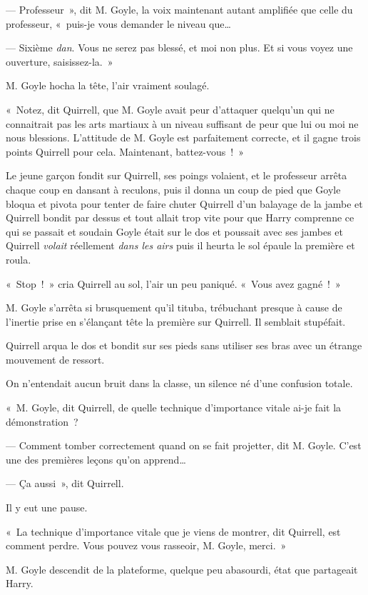 --- Professeur~», dit M. Goyle, la voix maintenant autant amplifiée que celle du professeur, «~puis-je vous demander le niveau que…

--- Sixième \emph{dan}.
Vous ne serez pas blessé, et moi non plus.
Et si vous voyez une ouverture, saisissez-la.~»

M. Goyle hocha la tête, l'air vraiment soulagé.

«~Notez, dit Quirrell, que M. Goyle avait peur d'attaquer quelqu'un qui ne connaitrait pas les arts martiaux à un niveau suffisant de peur que lui ou moi ne nous blessions.
L'attitude de M. Goyle est parfaitement correcte, et il gagne trois points Quirrell pour cela.
Maintenant, battez-vous~!~»

Le jeune garçon fondit sur Quirrell, ses poings volaient, et le professeur arrêta chaque coup en dansant à reculons, puis il donna un coup de pied que Goyle bloqua et pivota pour tenter de faire chuter Quirrell d'un balayage de la jambe et Quirrell bondit par dessus et tout allait trop vite pour que Harry comprenne ce qui se passait et soudain Goyle était sur le dos et poussait avec ses jambes et Quirrell \emph{volait} réellement \emph{dans les airs} puis il heurta le sol épaule la première et roula.

«~Stop~!~» cria Quirrell au sol, l'air un peu paniqué.
«~Vous avez gagné~!~»

M. Goyle s'arrêta si brusquement qu'il tituba, trébuchant presque à cause de l'inertie prise en s'élançant tête la première sur Quirrell.
Il semblait stupéfait.

Quirrell arqua le dos et bondit sur ses pieds sans utiliser ses bras avec un étrange mouvement de ressort.

On n'entendait aucun bruit dans la classe, un silence né d'une confusion totale.

«~M. Goyle, dit Quirrell, de quelle technique d'importance vitale ai-je fait la démonstration~?

--- Comment tomber correctement quand on se fait projetter, dit M. Goyle.
C'est une des premières leçons qu'on apprend…

--- Ça aussi~», dit Quirrell.

Il y eut une pause.

«~La technique d'importance vitale que je viens de montrer, dit Quirrell, est comment perdre.
Vous pouvez vous rasseoir, M. Goyle, merci.~»

M. Goyle descendit de la plateforme, quelque peu abasourdi, état que partageait Harry.

